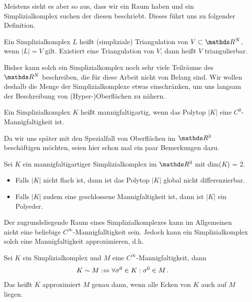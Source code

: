     Meistens sieht es aber so aus, dass wir ein Raum haben und ein Simplizialkomplex suchen der diesen beschriebt.
    Dieses führt uns zu folgender Definition.

    \begin{definition}
      Ein Simplizialkomplex \( L \) heißt (simpliziale) Triangulation von \( V \subset \R^{N} \), wenn \( |L| = V \) gilt.
      Existiert eine Triangulation von \( V \), dann heißt \( V \) triangulierbar.
    \end{definition}

    Bisher kann solch ein Simplizialkomplex noch sehr viele Teilräume des \( \R^{N} \) beschreiben, die für diese Arbeit nicht von Belang sind. 
    Wir wollen deshalb die Menge der Simplizialkomplexe etwas einschränken, um uns langsam der Beschreibung von (Hyper-)Oberflächen zu nähern.

    \begin{definition}
      Ein Simplizialkomplex \( K \) heißt mannigfaltigartig, wenn das Polytop \( |K| \) eine \( C^{0} \)-Mannigfaltigkeit ist.
    \end{definition}

    Da wir uns später mit den Spezialfall von Oberflächen im \( \R^{3} \) beschäftigen möchten, seien hier schon mal ein paar Bemerkungen dazu.
    
    \begin{bemerkung}
      Sei \( K \) ein mannigfaltigartiger Simplizialkomplex im \( \R^{3} \) mit dim(\( K \)) = 2.
      \begin{itemize}
        \item Falls \( |K| \) nicht flach ist, dann ist das Polytop \( |K| \) global nicht differenzierbar.
        \item Falls \( |K| \) zudem eine geschlossene Mannigfaltigkeit ist, dann ist \( |K| \) ein Polyeder.
      \end{itemize}
    \end{bemerkung}

    Der zugrundeliegende Raum eines Simplizialkomplexes kann im Allgemeinen nicht eine beliebige 
    \( C^{\infty} \)-Mannigfalltigkeit sein. Jedoch kann ein Simplizialkomplex solch eine
    Mannigfaltigkeit approximieren, d.h.
    
    \begin{definition}
      Sei \( K \) ein Simplizialkomplex und \( M \) eine \( C^{\infty} \)-Mannigfaltigkeit, dann
      \begin{align}
        K \sim M &:\Leftrightarrow \forall \sigma^{0}\in K : \sigma^{0} \in M \,\text{.}
      \end{align}
      Das heißt \( K \) approximiert \( M \) genau dann, wenn alle Ecken von \( K \) auch auf \( M \) liegen.
    \end{definition}

